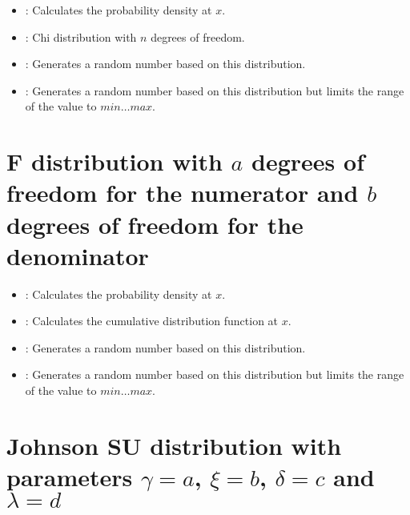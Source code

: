 \begin{itemize}

\item
{}:
Calculates the probability density at $x$.

\item
{}:
Chi distribution with $n$ degrees of freedom.

\item
{}:
Generates a random number based on this distribution.

\item
{}:
Generates a random number based on this distribution but limits the range of the value to $min\ldots max$.

\end{itemize}



\section{F distribution with \texorpdfstring{$a$}{a} degrees of freedom for the numerator and \texorpdfstring{$b$}{b} degrees of freedom for the denominator}

\begin{itemize}

\item
{}:
Calculates the probability density at $x$.

\item
{}:
Calculates the cumulative distribution function at $x$.

\item
{}:
Generates a random number based on this distribution.

\item
{}:
Generates a random number based on this distribution but limits the range of the value to $min\ldots max$.

\end{itemize}



\section{Johnson SU distribution with parameters \texorpdfstring{$\gamma=a$}{a}, \texorpdfstring{$\xi=b$}{b}, \texorpdfstring{$\delta=c$}{c} and \texorpdfstring{$\lambda=d$}{d}}

